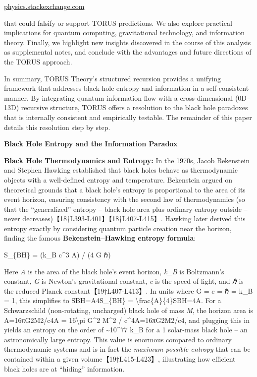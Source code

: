 \documentclass[]{article}
\begin{document}
\href{https://physics.stackexchange.com/questions/3521/has-the-black-hole-information-loss-paradox-been-settled\#:~:text=It\%20is\%20a\%20matter\%20of,what\%20you\%20mean\%20by\%20settled}{physics.stackexchange.com}

that could falsify or support TORUS predictions. We also explore
practical implications for quantum computing, gravitational technology,
and information theory. Finally, we highlight new insights discovered in
the course of this analysis as supplemental notes, and conclude with the
advantages and future directions of the TORUS approach.

In summary, TORUS Theory's structured recursion provides a unifying
framework that addresses black hole entropy and information in a
self-consistent manner. By integrating quantum information flow with a
cross-dimensional (0D--13D) recursive structure, TORUS offers a
resolution to the black hole paradoxes that is internally consistent and
empirically testable. The remainder of this paper details this
resolution step by step.

\textbf{Black Hole Entropy and the Information Paradox}

\textbf{Black Hole Thermodynamics and Entropy:} In the 1970s, Jacob
Bekenstein and Stephen Hawking established that black holes behave as
thermodynamic objects with a well-defined entropy and temperature.
Bekenstein argued on theoretical grounds that a black hole's entropy is
proportional to the area of its event horizon, ensuring consistency with
the second law of thermodynamics (so that the ``generalized'' entropy --
black hole area plus ordinary entropy outside -- never
decreases)【18†L393-L401】【18†L407-L415】. Hawking later derived this
entropy exactly by considering quantum particle creation near the
horizon, finding the famous \textbf{Bekenstein--Hawking entropy
formula}:

S\_\{BH\} = (k\_B c\^{}3 A) / (4 G ℏ)

Here \emph{A} is the area of the black hole's event horizon, \emph{k\_B}
is Boltzmann's constant, \emph{G} is Newton's gravitational constant,
\emph{c} is the speed of light, and \emph{ℏ} is the reduced Planck
constant【19†L407-L413】. In units where G = c = ℏ = k\_B = 1, this
simplifies to SBH=A4S\_\{BH\} = \textbackslash{}frac\{A\}\{4\}SBH​=4A​.
For a Schwarzschild (non-rotating, uncharged) black hole of mass
\emph{M}, the horizon area is A=16πG2M2/c4A = 16\textbackslash{}pi
G\^{}2 M\^{}2 / c\^{}4A=16πG2M2/c4, and plugging this in yields an
entropy on the order of \textasciitilde{}10\^{}77 k\_B for a 1
solar-mass black hole -- an astronomically large entropy. This value is
enormous compared to ordinary thermodynamic systems and is in fact the
\emph{maximum possible entropy} that can be contained within a given
volume【19†L415-L423】, illustrating how efficient black holes are at
``hiding'' information.
\end{document}
